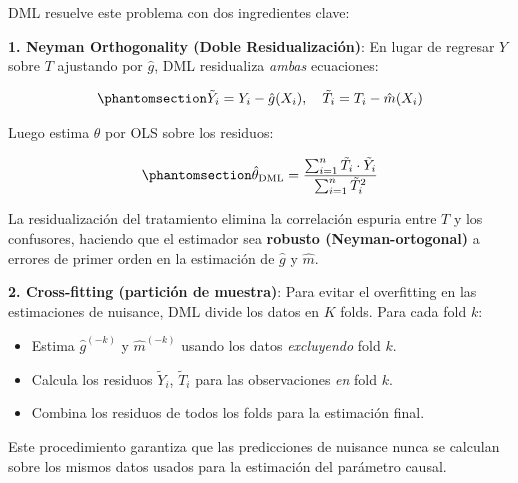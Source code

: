 \documentclass[
  spanish,
  11pt,
  letterpaper,
]{scrbook}
\providecommand{\tightlist}{%
  \setlength{\itemsep}{0pt}\setlength{\parskip}{0pt}}
\theoremstyle{plain}
\theoremstyle{remark}
\begin{document}
DML resuelve este problema con dos ingredientes clave:

\textbf{1. Neyman Orthogonality (Doble Residualización)}: En lugar de
regresar \(Y\) sobre \(T\) ajustando por \(\hat{g}\), DML residualiza
\emph{ambas} ecuaciones:

\begin{equation}\protect\phantomsection\label{eq-dml-residuals}{
\tilde{Y}_i = Y_i - \hat{g}(X_i), \quad \tilde{T}_i = T_i - \hat{m}(X_i)
}\end{equation}

Luego estima \(\theta\) por OLS sobre los residuos:

\begin{equation}\protect\phantomsection\label{eq-dml-estimator}{
\hat{\theta}_{\text{DML}} = \frac{\sum_{i=1}^{n} \tilde{T}_i \cdot \tilde{Y}_i}{\sum_{i=1}^{n} \tilde{T}_i^2}
}\end{equation}

La residualización del tratamiento elimina la correlación espuria entre
\(T\) y los confusores, haciendo que el estimador sea \textbf{robusto
(Neyman-ortogonal)} a errores de primer orden en la estimación de
\(\hat{g}\) y \(\hat{m}\).

\textbf{2. Cross-fitting (partición de muestra)}: Para evitar el
overfitting en las estimaciones de nuisance, DML divide los datos en
\(K\) folds. Para cada fold \(k\):

\begin{itemize}
\tightlist
\item
  Estima \(\hat{g}^{(-k)}\) y \(\hat{m}^{(-k)}\) usando los datos
  \emph{excluyendo} fold \(k\).
\item
  Calcula los residuos \(\tilde{Y}_i\), \(\tilde{T}_i\) para las
  observaciones \emph{en} fold \(k\).
\item
  Combina los residuos de todos los folds para la estimación final.
\end{itemize}

Este procedimiento garantiza que las predicciones de nuisance nunca se
calculan sobre los mismos datos usados para la estimación del parámetro
causal.
\end{document}
